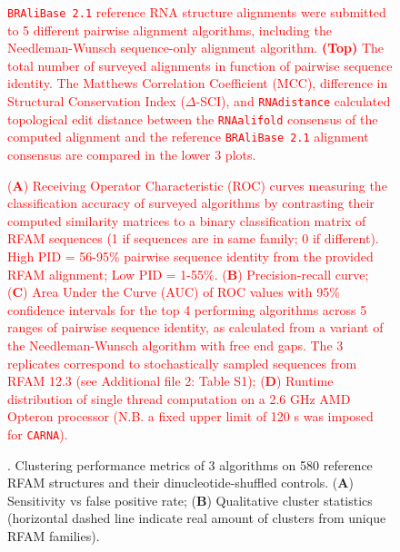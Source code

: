 \documentclass{bmcart}
\newcommand\bralibase{\texttt{BRAliBase 2.1}}
\newcommand\carna{\texttt{CARNA}}
\newcommand\rnaalifold{\texttt{RNAalifold}}
\begin{document}
\begin{backmatter}
\begin{figure}[h!]
 \caption {\csentence{  
 \textcolor{red} {
 Comparison of RNA structure alignment quality in function of sequence identity.}  
}
 \textcolor{red} {
 \bralibase{} reference RNA structure alignments were submitted to 5 different pairwise alignment algorithms, 
 including the Needleman-Wunsch sequence-only alignment algorithm. 
 \textbf{(Top)} The total number of surveyed alignments in function of pairwise sequence identity. The 
 Matthews Correlation Coefficient (MCC), difference in Structural Conservation Index ($\Delta$-SCI),
 and \texttt{RNAdistance} calculated topological edit distance between 
the \rnaalifold{} consensus of the computed alignment and the reference \bralibase{} alignment consensus 
 are compared in the lower 3 plots.  }
 }
\end{figure}


\begin{figure}[h!]
 \caption {
  \textcolor{red} {
 (\textbf{A}) Receiving Operator Characteristic (ROC) curves measuring the classification
 accuracy of surveyed algorithms by contrasting their computed similarity matrices 
 to a binary classification matrix of RFAM  sequences (1 if sequences are in same family; 
 0 if different). High PID =  56-95\% pairwise sequence identity from the provided RFAM alignment; Low PID  = 1-55\%.
 (\textbf{B}) Precision-recall curve;  
 (\textbf{C}) Area Under the Curve (AUC) of ROC values with 95\% confidence intervals 
for the top 4 performing algorithms across 5 ranges of pairwise sequence identity, 
 as calculated from a variant of the Needleman-Wunsch algorithm with free end gaps. 
 The 3 replicates correspond to stochastically sampled sequences from RFAM 12.3  (see Additional file 2: Table S1); 
 (\textbf{D}) Runtime distribution of single thread computation on a 2.6 GHz AMD Opteron processor 
 (N.B. a fixed upper limit of 120 s was  imposed for \carna{}). }  }
\end{figure}


\begin{figure}[h!]
 \caption {. Clustering performance metrics of 3 algorithms on 580 reference RFAM 
 structures and their dinucleotide-shuffled controls. (\textbf{A}) Sensitivity vs false positive rate; (\textbf{B}) Qualitative cluster statistics (horizontal dashed line indicate real amount of clusters from unique RFAM families). }
\end{figure}



\end{backmatter}
\end{document}
